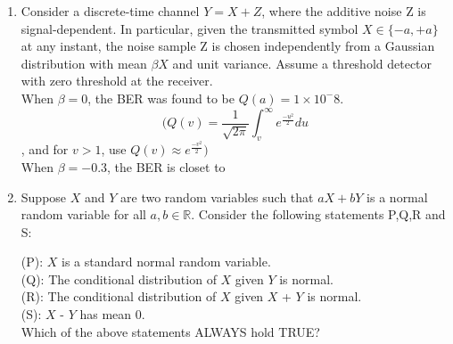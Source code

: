 \begin{enumerate}[label=\thesection.\arabic*.,ref=\thesection.\theenumi]
\item Consider a discrete-time channel $Y = X+Z$, where the additive noise Z is signal-dependent. In particular, given the transmitted symbol $X \in \{-a,+a\}$ at any instant, the noise sample Z is chosen independently from a Gaussian distribution with mean $\beta X$ and unit variance. Assume a threshold detector with zero threshold at the receiver.\\
When $\beta = 0$, the BER was found to be $Q(a) = 1 \times {10^-8}$.\\
$$
\bigg(Q(v)= \dfrac{1}{\sqrt{2 \pi}} \int_{v}^{\infty} e^{\frac{-u^2}{2}}du$$, and for $v>1$, use $Q(v) \approx e^{\frac{-v^2}{2}} \bigg)$ \\
When $\beta = -0.3$, the BER is closet to

\begin{enumerate}
\end{enumerate}
%
\solution

\item Suppose $X$ and $Y$ are two random variables such that $aX + bY$ is a normal random variable for all $a,b \in \mathbb{R}$. Consider the following statements P,Q,R and S:


 (P): $X$ is a standard normal random variable.\\
 (Q): The conditional distribution of $X$ given $Y$ is normal.\\
 (R): The conditional distribution of $X$ given $X$ + $Y$ is normal.\\
 (S): $X$ - $Y$ has mean $0$.\\

Which of the above statements ALWAYS hold TRUE?
\begin{enumerate}
\end{enumerate}
\end{enumerate}
